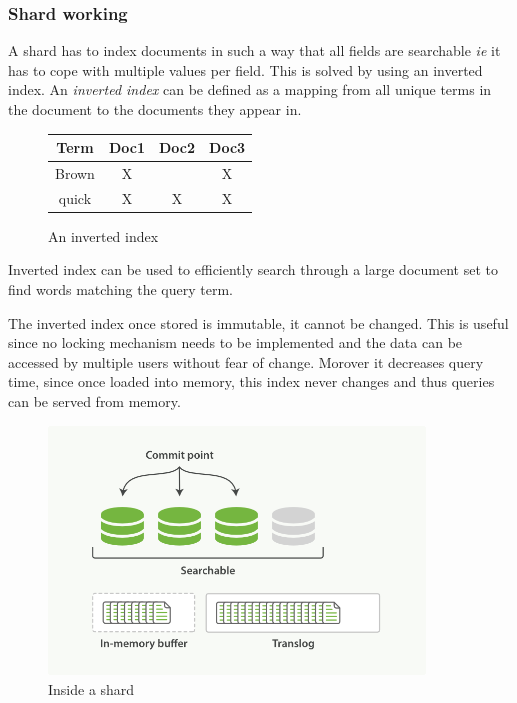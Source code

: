 \documentclass[12pt]{article}
\begin{document}
			\subsubsection{Shard working}
				A shard has to index documents in such a way that all fields are searchable \emph{ie} it has to cope with multiple values per field. This is solved by using an inverted index. An \emph{inverted index} can be defined as a mapping from all unique terms in the document to the documents they appear in.
				\begin{figure}[ht]
				\begin{center}
				\begin{tabular}{|c|c|c|c|}
					\hline
					Term & Doc1 & Doc2 & Doc3\\
					\hline
					\hline
					Brown & X &  & X \\
					\hline
					quick & X & X & X \\
					\hline
				\end{tabular} 
				\caption{An inverted index}
				\end{center}
				\end{figure}
				Inverted index can be used to efficiently search through a large document set to find words matching the query term.

				The inverted index once stored is immutable, it cannot be changed. This is useful since no locking mechanism needs to be implemented and the data can be accessed by multiple users without fear of change. Morover it decreases query time, since once loaded into memory, this index never changes and thus queries can be served from memory.

				\begin{figure}[ht]
					\centering\includegraphics[width=10cm]{images/inside_shard}
					\caption{Inside a shard}
				\end{figure}
\end{document}

